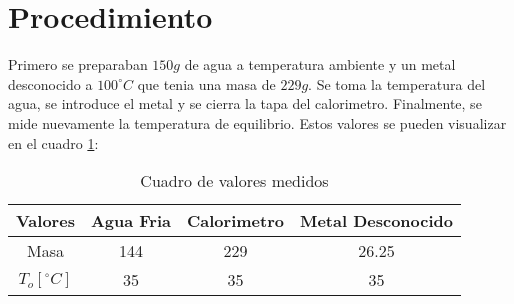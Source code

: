 \documentclass[12pt]{report}
\begin{document}
\section{Procedimiento}
Primero se preparaban $150 g$ de agua a temperatura ambiente y un metal desconocido a $100^\circ C$ que tenia una masa de $229 g$. Se toma la temperatura del agua, se introduce el metal y se cierra la tapa del calorimetro. Finalmente, se mide nuevamente la temperatura de equilibrio.
Estos valores se pueden visualizar en el cuadro \ref{table:data}:

\begin{table}[h!]
\centering
\begin{tabular}{||c c c c||}
    \hline
    Valores & Agua Fria & Calorimetro & Metal Desconocido \\ [0.5ex]
    \hline\hline
    Masa & 144 & 229 & 26.25 \\
    $T_o [^\circ C]$ & 35 & 35 & 35 \\
    \hline
\end{tabular}
\caption{Cuadro de valores medidos}
\label{table:data}
\end{table}
\end{document}
